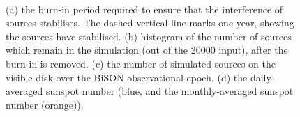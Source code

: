 \begin{figure}[!ht]
	\centering
	\qquad
	 \\
	
	\qquad
	
	\qquad
	
	\caption{(a) the burn-in period required to ensure that the interference of sources stabilises. The dashed-vertical line marks one year, showing the sources have stabilised. (b) histogram of the number of sources which remain in the simulation (out of the 20000 input), after the burn-in is removed. (c) the number of simulated sources on the visible disk over the BiSON observational epoch. (d) the daily-averaged sunspot number (blue, and the monthly-averaged sunspot number (orange)).}
	\label{fig:artificial_sim_config}
\end{figure}



